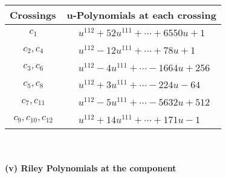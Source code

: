 \documentclass[1p]{elsarticle_modified}
\theoremstyle{definition}
\begin{document}
\begin{tabular}{m{50pt}|m{274pt}}
Crossings & \hspace{64pt}u-Polynomials at each crossing \\
\hline $$\begin{aligned}c_{1}\end{aligned}$$&$\begin{aligned}
&u^{112}+52 u^{111}+\cdots+6550 u+1
\end{aligned}$\\
\hline $$\begin{aligned}c_{2},c_{4}\end{aligned}$$&$\begin{aligned}
&u^{112}-12 u^{111}+\cdots+78 u+1
\end{aligned}$\\
\hline $$\begin{aligned}c_{3},c_{6}\end{aligned}$$&$\begin{aligned}
&u^{112}-4 u^{111}+\cdots-1664 u+256
\end{aligned}$\\
\hline $$\begin{aligned}c_{5},c_{8}\end{aligned}$$&$\begin{aligned}
&u^{112}+3 u^{111}+\cdots-224 u-64
\end{aligned}$\\
\hline $$\begin{aligned}c_{7},c_{11}\end{aligned}$$&$\begin{aligned}
&u^{112}-5 u^{111}+\cdots-5632 u+512
\end{aligned}$\\
\hline $$\begin{aligned}c_{9},c_{10},c_{12}\end{aligned}$$&$\begin{aligned}
&u^{112}+14 u^{111}+\cdots+171 u-1
\end{aligned}$\\
\hline
\end{tabular}\\~\\
\newpage\renewcommand{\arraystretch}{1}
\flushleft \textbf{(v) Riley Polynomials at the component}\newline \\
\end{document}
